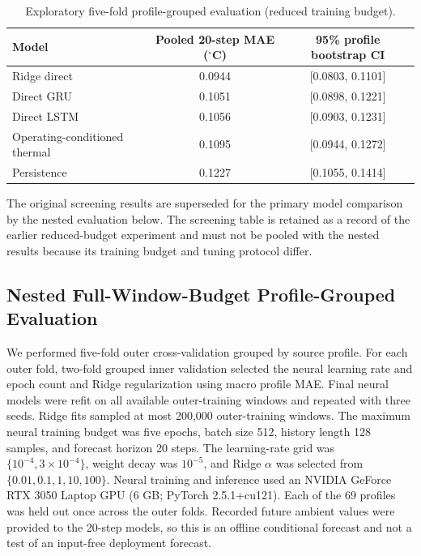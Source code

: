 \documentclass[conference]{IEEEtran}
\begin{document}
\begin{table}[!t]
\centering
\caption{Exploratory five-fold profile-grouped evaluation (reduced training budget).}
\label{tab:screening_cv}
\begin{tabular}{lcc}
\toprule
Model & Pooled 20-step MAE ($^{\circ}$C) & 95\% profile bootstrap CI\\
\midrule
Ridge direct & 0.0944 & [0.0803, 0.1101]\\
Direct GRU & 0.1051 & [0.0898, 0.1221]\\
Direct LSTM & 0.1056 & [0.0903, 0.1231]\\
Operating-conditioned thermal & 0.1095 & [0.0944, 0.1272]\\
Persistence & 0.1227 & [0.1055, 0.1414]\\
\bottomrule
\end{tabular}
\end{table}

The original screening results are superseded for the primary model comparison
by the nested evaluation below. The screening table is retained as a record of
the earlier reduced-budget experiment and must not be pooled with the nested
results because its training budget and tuning protocol differ.

\subsection{Nested Full-Window-Budget Profile-Grouped Evaluation}
We performed five-fold outer cross-validation grouped by source profile. For
each outer fold, two-fold grouped inner validation selected the neural learning
rate and epoch count and Ridge regularization using macro profile MAE. Final
neural models were refit on all available outer-training windows and repeated
with three seeds. Ridge fits sampled at most 200,000 outer-training windows.
The maximum neural training budget was five epochs, batch size 512,
history length 128 samples, and forecast horizon 20 steps. The learning-rate
grid was $\{10^{-4},3\times10^{-4}\}$, weight decay was $10^{-5}$, and Ridge
$\alpha$ was selected from $\{0.01,0.1,1,10,100\}$. Neural training and
inference used an NVIDIA GeForce RTX 3050 Laptop GPU (6 GB; PyTorch
2.5.1+cu121). Each of the 69 profiles was held out once across the outer
folds. Recorded future ambient values were provided to the 20-step models, so
this is an offline conditional forecast and not a test of an input-free
deployment forecast.
\end{document}
